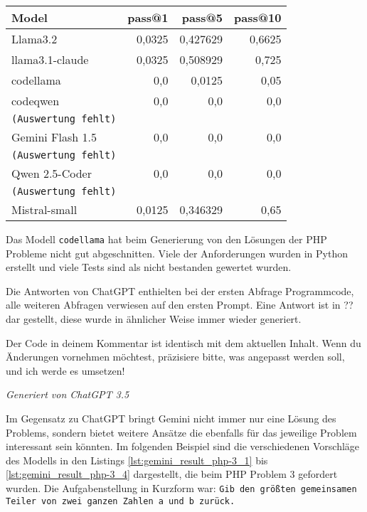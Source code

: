 \begin{table}[!ht]
	\begin{tabular}{l|r|r|r}
		\textbf{Model} & \textbf{pass@1} & \textbf{pass@5} & \textbf{pass@10} \\
		\hline
		Llama3.2 & 0,0325 & 0,427629 & 0,6625 \\
		llama3.1-claude & 0,0325 & 0,508929 & 0,725 \\
		codellama & 0,0 & 0,0125 & 0,05 \\
		codeqwen & 0,0 & 0,0 & 0,0 \\
		\texttt{(Auswertung fehlt)} &&& \\
		Gemini Flash 1.5 & 0,0 & 0,0 & 0,0\\
		\texttt{(Auswertung fehlt)} &&& \\
		Qwen 2.5-Coder & 0,0 & 0,0 & 0,0 \\
		\texttt{(Auswertung fehlt)} &&& \\
		Mistral-small & 0,0125 & 0,346329 & 0,65 \\
	\end{tabular}
	\centering
	\label{tab:prompt_results_open_models}
\end{table}

Das Modell \texttt{codellama} hat beim Generierung von den Lösungen der PHP Probleme nicht gut abgeschnitten. Viele der Anforderungen wurden in Python erstellt und viele Tests sind als nicht bestanden gewertet wurden.\vspace{0.2cm}

Die Antworten von ChatGPT enthielten bei der ersten Abfrage Programmcode, alle weiteren Abfragen verwiesen auf den ersten Prompt. Eine Antwort ist in ?? dar gestellt, diese wurde in ähnlicher Weise immer wieder generiert.

\hrulefill

Der Code in deinem Kommentar ist identisch mit dem aktuellen Inhalt. Wenn du Än\-der\-ungen vornehmen möchtest, präzisiere bitte, was angepasst werden soll, und ich werde es umsetzen!
\begin{flushright}
	\textit{Generiert von ChatGPT 3.5}
\end{flushright}
\hrulefill

Im Gegensatz zu ChatGPT bringt Gemini nicht immer nur eine Lösung des Problems, sondern bietet weitere Ansätze die ebenfalls für das jeweilige Problem interessant sein könnten. Im folgenden Beispiel sind die verschiedenen Vorschläge des Modells in den Listings \ref{lst:gemini_result_php-3_1} bis \ref{lst:gemini_result_php-3_4} dargestellt, die beim PHP Problem 3 gefordert wurden. Die Aufgabenstellung in Kurzform war: \texttt{Gib den größten gemeinsamen Teiler von zwei ganzen Zahlen a und b zurück.}

